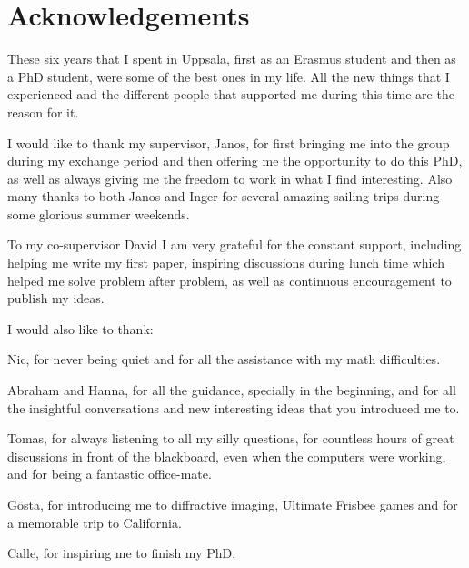 \chapter*{Acknowledgements}

These six years that I spent in Uppsala, first as an Erasmus student and then as
a PhD student, were some of the best ones in my life. All the new things that I
experienced and the different people that supported me during this time are the
reason for it. 
\vspace{0.5cm}

\noindent
I would like to thank my supervisor, Janos, for first bringing me into the group during my
exchange period and then offering me the opportunity to do this PhD, as well as
always giving me the freedom to work in what I find interesting. Also many 
thanks to both Janos and Inger for several amazing sailing trips during some
glorious summer weekends.
\vspace{0.5cm}

\noindent
To my co-supervisor David I am very grateful for the constant support, including
helping me write my first paper, inspiring discussions during lunch time
which helped me solve problem after problem, as well as continuous encouragement to
publish my ideas.
\vspace{0.5cm}

\noindent
I would also like to thank:
\vspace{0.5cm}

\noindent
Nic, for never being quiet and for all the assistance with my math difficulties.
\vspace{0.5cm}

\noindent
Abraham and Hanna, for all the guidance, specially in the beginning,  and for all
the insightful conversations and new interesting ideas that you introduced me
to.
\vspace{0.5cm}

\noindent
Tomas, for always listening to all my silly questions, for countless hours of great
discussions in front of the blackboard, even when the computers were working,
and for being a fantastic office-mate.
\vspace{0.5cm}
 
\noindent
G\"osta, for introducing me to diffractive imaging, Ultimate Frisbee games and for a memorable trip to California.
\vspace{0.5cm}

\noindent
Calle, for inspiring me to finish my PhD.
\vspace{0.5cm}

